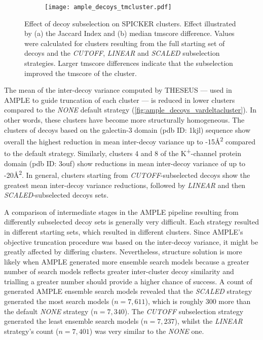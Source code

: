 \begin{figure}[H]\ContinuedFloat
    \begin{subfigure}[b]{\textwidth}
        \texttt{[image: ample\_decoys\_tmcluster.pdf]}
        \caption{}
        \label{fig:ample_decoys_tmcluster}
    \end{subfigure}
    \caption[Effect of decoy subselection on SPICKER clusters]{Effect of decoy subselection on SPICKER clusters. Effect illustrated by (a) the Jaccard Index and (b) median \gls{tmscore} difference. Values were calculated for clusters resulting from the full starting set of decoys and the \textit{CUTOFF}, \textit{LINEAR} and \textit{SCALED} subselection strategies. Larger \gls{tmscore} differences indicate that the subselection improved the \gls{tmscore} of the cluster.}
\end{figure}

The mean of the inter-decoy variance computed by THESEUS --- used in AMPLE to guide truncation of each cluster --- is reduced in lower clusters compared to the \textit{NONE} default strategy (\cref{fig:ample_decoys_vardeltacluster}). In other words, these clusters have become more structurally homogeneous. The clusters of decoys based on the galectin-3 domain (\gls{pdb} ID: 1kjl) sequence show overall the highest reduction in mean inter-decoy variance up to -15\AA\textsuperscript{2} compared to the default strategy. Similarly, clusters 4 and 8 of the K\textsuperscript{+}-channel protein domain (\gls{pdb} ID: 3ouf) show reductions in mean inter-decoy variance of up to -20\AA\textsuperscript{2}. In general, clusters starting from \textit{CUTOFF}-subselected decoys show the greatest mean inter-decoy variance reductions, followed by \textit{LINEAR} and then \textit{SCALED}-subselected decoys sets.

A comparison of intermediate stages in the AMPLE pipeline resulting from differently subselected decoy sets is generally very difficult. Each strategy resulted in different starting sets, which resulted in different clusters. Since AMPLE's objective truncation procedure was based on the inter-decoy variance, it might be greatly affected by differing clusters. Nevertheless, structure solution is more likely when AMPLE generated more ensemble search models because a greater number of search models reflects greater inter-cluster decoy similarity and trialling a greater number should provide a higher chance of success. A count of generated AMPLE ensemble search models revealed that the \textit{SCALED} strategy generated the most search models ($n=7,611$), which is roughly 300 more than the default \textit{NONE} strategy ($n=7,340$). The \textit{CUTOFF} subselection strategy generated the least ensemble search models ($n=7,237$), whilst the \textit{LINEAR} strategy's count ($n=7,401$) was very similar to the \textit{NONE} one.

